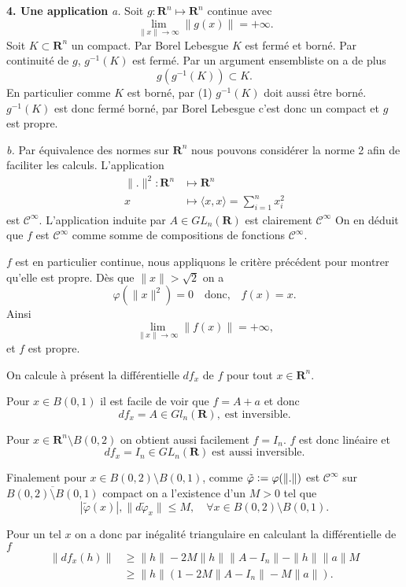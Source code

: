 \documentclass[12pt]{article}
\newcommand{\defeq}{\vcentcolon=}
\newcommand{\R}{\mathbf{R}}
\begin{document}
\textbf{4. Une application} \textit{a.} Soit $g : \R^{n} \longmapsto \R^{n}$ continue avec  
\begin{equation}
        \lim_{\|x\|\to \infty}\|g(x)\| = +\infty.
\end{equation}
Soit $K \subset \R^{n}$ un compact. Par Borel Lebesgue $K$ est fermé et borné. Par continuité de $g$, $g^{-1}(K)$ est fermé. Par un argument ensembliste on a de plus \[
g(g^{-1}(K)) \subset K
.\] En particulier comme $K$ est borné, par (1) $g^{-1}(K)$ doit aussi être borné. $g^{-1}(K)$ est donc fermé borné, par Borel Lebesgue c'est donc un compact et $g$ est propre. 

\medskip

\textit{b.} Par équivalence des normes sur $\R^{n}$ nous pouvons considérer la norme 2 afin de faciliter les calculs. L'application
\begin{align*}
        \|.\|^{2} : \R^{n} &\longmapsto \R^{n} \\
        x &\longmapsto \langle x, x \rangle = \sum_{i=1}^{n}x_{i}^{2}
\end{align*} est $\mathcal{C}^{\infty}$. L'application induite par $A \in GL_{n}(\R)$ est clairement $\mathcal{C}^{\infty}$ On en déduit que $f$ est $\mathcal{C}^{\infty}$ comme somme de compositions de fonctions $\mathcal{C}^{\infty}$.


$f$ est en particulier continue, nous appliquons le critère précédent pour montrer qu'elle est propre. Dès que $\|x\| > \sqrt{2}$ on a \[
        \varphi(\|x\|^{2}) = 0 \quad \text{donc,} \quad f(x) = x
.\] Ainsi \[
\lim_{\|x\|\to \infty}\|f(x)\| = +\infty
,\] et $f$ est propre. 

On calcule à présent la différentielle $df_{x}$ de $f$ pour tout $x \in \R^{n}$. 

Pour $x \in B(0,1)$ il est facile de voir que $f = A + a$ et donc  \[
        df_{x} = A \in Gl_{n}(\R), \; \text{est inversible}
.\]

Pour $x \in \R^{n}\setminus B(0,2)$ on obtient aussi facilement $f = I_{n}$. $f$ est donc linéaire et  \[
        df_{x} = I_{n} \in GL_{n}(\R) \; \text{est aussi inversible}
.\] 

Finalement pour $x \in B(0,2)\setminus B(0,1)$, comme $\tilde{\varphi} \defeq \varphi(\|.\|)$ est $\mathcal{C}^{\infty}$ sur $\overline{B(0,2)\setminus B(0,1)}$ compact on a l'existence d'un $M > 0$ tel que \[
        |\tilde{\varphi}(x)|, \|d\tilde{\varphi}_{x}\| \le M, \quad \forall x \in B(0,2)\setminus B(0,1)
.\]  

Pour un tel $x$ on a donc par inégalité triangulaire en calculant la différentielle de $f$ 
\begin{align*}
        \|df_{x}(h)\| &\ge \|h\| - 2M\|h\|\|A-I_{n}\| - \|h\|\|a\|M \\
                      &\ge \|h\|(1-2M\|A-I_{n}\|-M\|a\|) 
.\end{align*}
\end{document}
